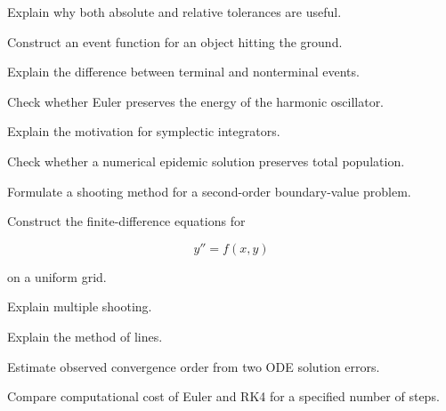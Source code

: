 \begin{exercise}[3]
Explain why both absolute and relative tolerances are useful.
\end{exercise}

\begin{exercise}[3]
Construct an event function for an object hitting the ground.
\end{exercise}

\begin{exercise}[3]
Explain the difference between terminal and nonterminal events.
\end{exercise}

\begin{exercise}[3]
Check whether Euler preserves the energy of the harmonic oscillator.
\end{exercise}

\begin{exercise}[3]
Explain the motivation for symplectic integrators.
\end{exercise}

\begin{exercise}[3]
Check whether a numerical epidemic solution preserves total population.
\end{exercise}

\begin{exercise}[3]
Formulate a shooting method for a second-order boundary-value problem.
\end{exercise}

\begin{exercise}[3]
Construct the finite-difference equations for

\[
y''=f(x,y)
\]

on a uniform grid.
\end{exercise}

\begin{exercise}[3]
Explain multiple shooting.
\end{exercise}

\begin{exercise}[3]
Explain the method of lines.
\end{exercise}

\begin{exercise}[3]
Estimate observed convergence order from two ODE solution errors.
\end{exercise}

\begin{exercise}[3]
Compare computational cost of Euler and RK4 for a specified number of
steps.
\end{exercise}


